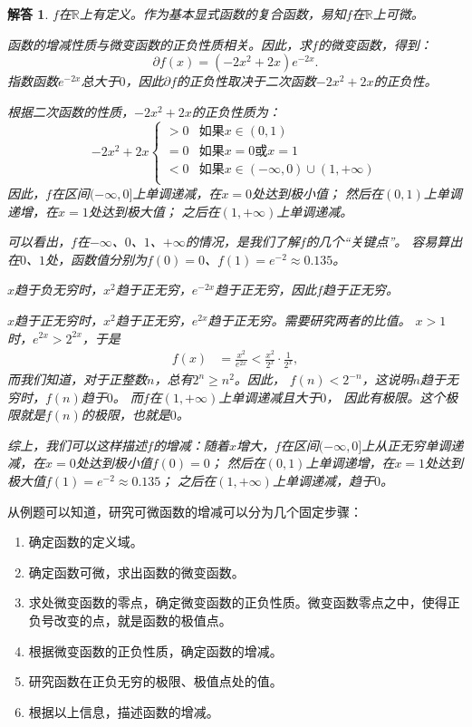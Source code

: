 \documentclass[12pt,UTF8]{ctexbook}
\newtheorem*{so}{解答}
\begin{document}
\begin{so}
    $f$在$\mathbb{R}$上有定义。作为基本显式函数的复合函数，易知$f$在$\mathbb{R}$上可微。

    函数的增减性质与微变函数的正负性质相关。因此，求$f$的微变函数，得到：
    $$ \partial f(x) = (-2x^2 + 2x) e^{-2x}.$$
    指数函数$ e^{-2x} $总大于$0$，因此$ \partial f $的正负性取决于二次函数$-2x^2 + 2x$的正负性。
    
    根据二次函数的性质，$-2x^2 + 2x$的正负性质为：
    $$ -2x^2 + 2x \left\{
        \begin{array}{cl}
            > 0 & \mbox{如果}x \in (0, 1) \\
            = 0 & \mbox{如果}x = 0 \mbox{或} x = 1 \\
            < 0 & \mbox{如果}x \in (-\infty, 0)\cup (1, +\infty)\\
        \end{array}\right.
    $$
    因此，$f$在区间$(-\infty, 0]$上单调递减，在$x = 0$处达到极小值；
    然后在$(0, 1)$上单调递增，在$x = 1$处达到极大值；
    之后在$(1, +\infty)$上单调递减。

    可以看出，$f$在$-\infty$、$0$、$1$、$+\infty$的情况，是我们了解$f$的几个“关键点”。
    容易算出在$0$、$1$处，函数值分别为$f(0) = 0$、$f(1) = e^{-2} \approx 0.135$。
    
    $x$趋于负无穷时，$x^2$趋于正无穷，$e^{-2x}$趋于正无穷，因此$f$趋于正无穷。

    $x$趋于正无穷时，$x^2$趋于正无穷，$e^{2x}$趋于正无穷。需要研究两者的比值。
    $x > 1$时，$e^{2x} > 2^{2x}$，于是
    \begin{align*}
        f(x) &= \frac{x^2}{e^{2x}} < \frac{x^2}{2^x} \cdot \frac{1}{2^x}, 
    \end{align*} 
    而我们知道，对于正整数$n$，总有$2^n \geqslant n^2$。因此，
    $f(n) < 2^{-n}$，这说明$n$趋于无穷时，$f(n)$趋于$0$。
    而$f$在$(1,+\infty)$上单调递减且大于$0$，
    因此有极限。这个极限就是$f(n)$的极限，也就是$0$。

    综上，我们可以这样描述$f$的增减：随着$x$增大，$f$在区间$(-\infty, 0]$上从正无穷单调递减，在$x = 0$处达到极小值$f(0) = 0$；
    然后在$(0, 1)$上单调递增，在$x = 1$处达到极大值$f(1) = e^{-2} \approx 0.135$；
    之后在$(1, +\infty)$上单调递减，趋于$0$。
\end{so}

从例题可以知道，研究可微函数的增减可以分为几个固定步骤：
\begin{enumerate}
    \item 确定函数的定义域。
    \item 确定函数可微，求出函数的微变函数。
    \item 求处微变函数的零点，确定微变函数的正负性质。微变函数零点之中，使得正负号改变的点，就是函数的极值点。
    \item 根据微变函数的正负性质，确定函数的增减。
    \item 研究函数在正负无穷的极限、极值点处的值。
    \item 根据以上信息，描述函数的增减。
\end{enumerate}
\end{document}

